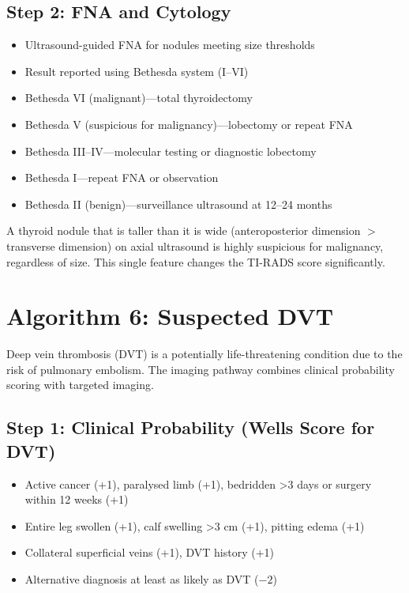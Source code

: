 \subsection{Step 2: FNA and Cytology}
\begin{itemize}
    \item Ultrasound-guided FNA for nodules meeting size thresholds
    \item Result reported using Bethesda system (I--VI)
    \item Bethesda VI (malignant)---total thyroidectomy
    \item Bethesda V (suspicious for malignancy)---lobectomy or repeat FNA
    \item Bethesda III--IV---molecular testing or diagnostic lobectomy
    \item Bethesda I---repeat FNA or observation
    \item Bethesda II (benign)---surveillance ultrasound at 12--24 months
\end{itemize}

\begin{pearlbox}
A thyroid nodule that is taller than it is wide (anteroposterior dimension $>$ transverse dimension) on axial ultrasound is highly suspicious for malignancy, regardless of size. This single feature changes the TI-RADS score significantly.
\end{pearlbox}

\clearpage

\section{Algorithm 6: Suspected DVT}

Deep vein thrombosis (DVT) is a potentially life-threatening condition due to the risk of pulmonary embolism. The imaging pathway combines clinical probability scoring with targeted imaging.

\subsection{Step 1: Clinical Probability (Wells Score for DVT)}
\begin{itemize}
    \item Active cancer (+1), paralysed limb (+1), bedridden >3 days or surgery within 12 weeks (+1)
    \item Entire leg swollen (+1), calf swelling >3 cm (+1), pitting edema (+1)
    \item Collateral superficial veins (+1), DVT history (+1)
    \item Alternative diagnosis at least as likely as DVT ($-2$)
\end{itemize}

